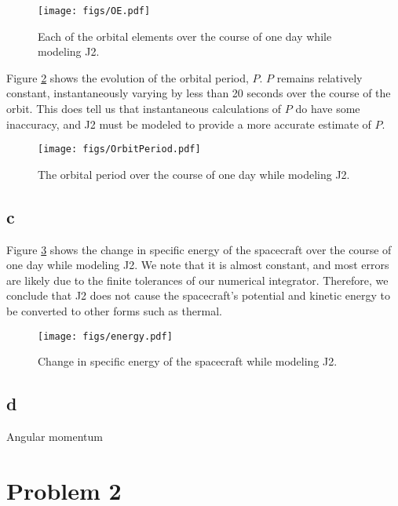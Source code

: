 \documentclass[11pt]{article}
\begin{document}
\begin{figure}[h!]
	\centering
	\texttt{[image: figs/OE.pdf]}
	\caption{Each of the orbital elements over the course of one day while modeling J2.}
	\label{fig:OE}
\end{figure}

Figure \ref{fig:OrbitPeriod} shows the evolution of the orbital period, $P$. $P$ remains relatively constant, instantaneously varying by less than 20 seconds over the course of the orbit. This does tell us that instantaneous calculations of $P$ do have some inaccuracy, and J2 must be modeled to provide a more accurate estimate of $P$. \\

\begin{figure}[h!]
	\centering
	\texttt{[image: figs/OrbitPeriod.pdf]}
	\caption{The orbital period over the course of one day while modeling J2.}
	\label{fig:OrbitPeriod}
\end{figure}

\subsection{c}

Figure \ref{fig:energy} shows the change in specific energy of the spacecraft over the course of one day while modeling J2. We note that it is almost constant, and most errors are likely due to the finite tolerances of our numerical integrator. Therefore, we conclude that J2 does not cause the spacecraft's potential and kinetic energy to be converted to other forms such as thermal. \\

\begin{figure}[h!]
	\centering
	\texttt{[image: figs/energy.pdf]}
	\caption{Change in specific energy of the spacecraft while modeling J2.}
	\label{fig:energy}
\end{figure}

\subsection{d}

Angular momentum

\section{Problem 2}
\end{document}
